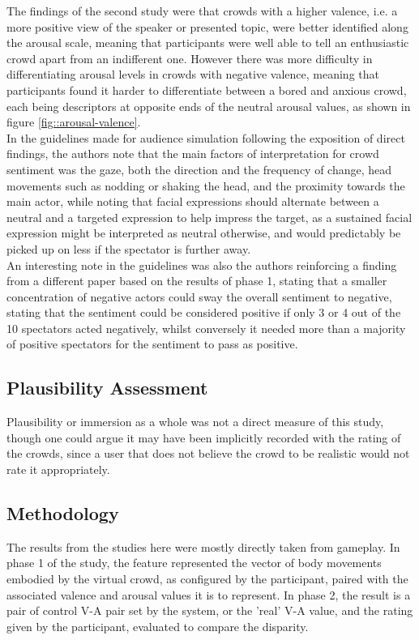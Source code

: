 The findings of the second study were that crowds with a higher valence, i.e. a more positive view of the speaker or presented topic, were better identified along the arousal scale, meaning that participants were well able to tell an enthusiastic crowd apart from an indifferent one. However there was more difficulty in differentiating arousal levels in crowds with negative valence, meaning that participants found it harder to differentiate between a bored and anxious crowd, each being descriptors at opposite ends of the neutral arousal values, as shown in figure \ref{fig::arousal-valence}.\\
In the guidelines made for audience simulation following the exposition of direct findings, the authors note that the main factors of interpretation for crowd sentiment was the gaze, both the direction and the frequency of change, head movements such as nodding or shaking the head, and the proximity towards the main actor, while noting that facial expressions should alternate between a neutral and a targeted expression to help impress the target, as a sustained facial expression might be interpreted as neutral otherwise, and would predictably be picked up on less if the spectator is further away.\\
An interesting note in the guidelines was also the authors reinforcing a finding from a different paper based on the results of phase 1, stating that a smaller concentration of negative actors could sway the overall sentiment to negative, stating that the sentiment could be considered positive if only 3 or 4 out of the 10 spectators acted negatively, whilst conversely it needed more than a majority of positive spectators for the sentiment to pass as positive.

\subsection{Plausibility Assessment}

Plausibility or immersion as a whole was not a direct measure of this study, though one could argue it may have been implicitly recorded with the rating of the crowds, since a user that does not believe the crowd to be realistic would not rate it appropriately.

\subsection{Methodology}

The results from the studies here were mostly directly taken from gameplay. In phase 1 of the study, the feature represented the vector of body movements embodied by the virtual crowd, as configured by the participant, paired with the associated valence and arousal values it is to represent. In phase 2, the result is a pair of control V-A pair set by the system, or the 'real' V-A value, and the rating given by the participant, evaluated to compare the disparity.\\

